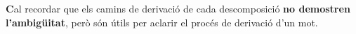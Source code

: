 \documentclass{article}
\begin{document}
\vspace{1em}

\noindent \textbf Cal recordar que els camins de derivació de cada descomposició \textbf{no demostren l'ambigüitat}, però són útils per aclarir el procés de derivació d'un mot.

\begin{comment}    

\noindent Els camins de derivació de cada descomposició són els següents \textbf{No demostren l'ambigüitat}, però són útils per aclarir el procés de derivació d'un mot:

\begin{align*}
S &\xRightarrow[S \to AaBA]{} AaBA \\
   &\xRightarrow[A \to aA]{} aBA \\
   &\xRightarrow[B \to bb]{} abbA \\
   &\xRightarrow[A \to \lambda]{} abba
\end{align*}

\begin{align*}
S &\xRightarrow[S \to ABaA]{} ABaA \\
   &\xRightarrow[A \to aA]{} aBaA \\
   &\xRightarrow[B \to bb]{} abbaA \\
   &\xRightarrow[A \to \lambda]{} abba
\end{align*}
\vspace{1em}
\end{comment}
\end{document}
